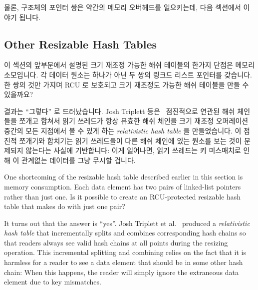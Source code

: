 물론,  구조체의 포인터 쌍은 약간의 메모리 오버헤드를 일으키는데,
다음 섹션에서 이야기 됩니다.

\subsection{Other Resizable Hash Tables}
\label{sec:datastruct:Other Resizable Hash Tables}

이 섹션의 앞부분에서 설명된 크기 재조정 가능한 해쉬 테이블의 한가지 단점은
메모리 소모입니다.
각 데이터 원소는 하나가 아닌 두 쌍의 링크드 리스트 포인터를 갖습니다.
한 쌍의 것만 가지며 RCU 로 보호되고 크기 재조정도 가능한 해쉬 테이블을 만들 수
있을까요?

결과는 ``그렇다'' 로 드러났습니다.
Josh Triplett 등은~\cite{Triplett:2011:RPHash} 점진적으로 연관된 해쉬 체인들을
쪼개고 합쳐서 읽기 쓰레드가 항상 유효한 해쉬 체인을 크기 재조정 오퍼레이션
중간의 모든 지점에서 볼 수 있게 하는 \emph{relativistic hash table} 을
만들었습니다.
이 점진적 쪼개기와 합치기는 읽기 쓰레드들이 다른 해쉬 체인에 있는 원소를 보는
것이 문제되지 않는다는 사실에 기반합니다: 이게 일어나면, 읽기 쓰레드는 키
미스매치로 인해 이 관계없는 데이터를 그냥 무시할 겁니다.

\iffalse

One shortcoming of the resizable hash table described earlier in this
section is memory consumption.
Each data element has two pairs of linked-list pointers rather than just
one.
Is it possible to create an RCU-protected resizable hash table that
makes do with just one pair?

It turns out that the answer is ``yes''.
Josh Triplett et al.~\cite{Triplett:2011:RPHash}
produced a \emph{relativistic hash table} that incrementally
splits and combines corresponding hash chains so that readers always
see valid hash chains at all points during the resizing operation.
This incremental splitting and combining relies on the fact that it
is harmless for a reader to see a data element that should be in some
other hash chain: When this happens, the reader will simply ignore the
extraneous data element due to key mismatches.

